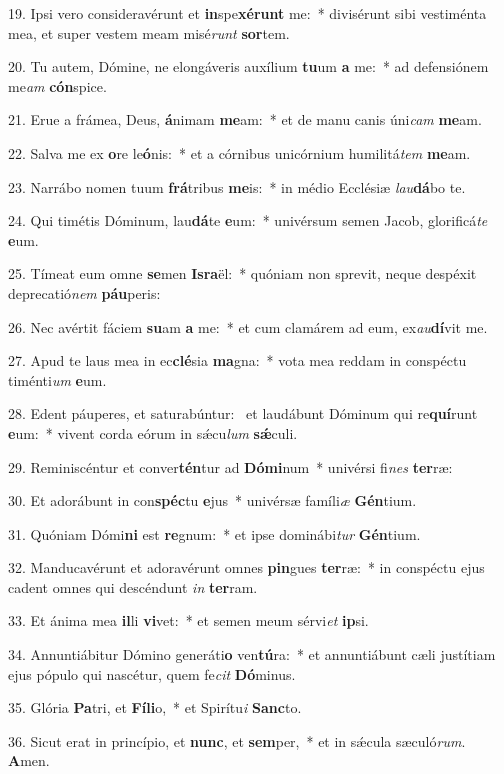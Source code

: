 19. Ipsi vero consideravérunt et \textbf{in}spe\textbf{xé}\textbf{runt} me:~*  divisérunt sibi vestiménta mea, et super vestem meam misé\textit{runt} \textbf{sor}tem.\

20. Tu autem, Dómine, ne elongáveris auxílium \textbf{tu}um \textbf{a} me:~*  ad defensiónem me\textit{am} \textbf{cón}spice.\

21. Erue a frámea, Deus, \textbf{á}nimam \textbf{me}am:~*  et de manu canis úni\textit{cam} \textbf{me}am.\

22. Salva me ex \textbf{o}re le\textbf{ó}nis:~*  et a córnibus unicórnium humilitá\textit{tem} \textbf{me}am.\

23. Narrábo nomen tuum \textbf{frá}tribus \textbf{me}is:~*  in médio Ecclésiæ \textit{lau}\textbf{dá}bo te.\

24. Qui timétis Dóminum, lau\textbf{dá}te \textbf{e}um:~*  univérsum semen Jacob, glorificá\textit{te} \textbf{e}um.\

25. Tímeat eum omne \textbf{se}men \textbf{Is}\textbf{ra}ël:~*  quóniam non sprevit, neque despéxit deprecatió\textit{nem} \textbf{páu}peris:\

26. Nec avértit fáciem \textbf{su}am \textbf{a} me:~*  et cum clamárem ad eum, ex\textit{au}\textbf{dí}vit me.\

27. Apud te laus mea in ec\textbf{clé}sia \textbf{ma}gna:~*  vota mea reddam in conspéctu timénti\textit{um} \textbf{e}um.\

28. Edent páuperes, et saturabúntur: \dag\  et laudábunt Dóminum qui re\textbf{quí}runt \textbf{e}um:~*  vivent corda eórum in sǽcu\textit{lum} \textbf{sǽ}culi.\

29. Reminiscéntur et conver\textbf{tén}tur ad \textbf{Dó}\textbf{mi}num~*  univérsi fi\textit{nes} \textbf{ter}ræ:\

30. Et adorábunt in con\textbf{spéc}tu \textbf{e}jus~*  univérsæ famíli\textit{æ} \textbf{Gén}tium.\

31. Quóniam Dómi\textbf{ni} est \textbf{re}gnum:~*  et ipse dominábi\textit{tur} \textbf{Gén}tium.\

32. Manducavérunt et adoravérunt omnes \textbf{pin}gues \textbf{ter}ræ:~*  in conspéctu ejus cadent omnes qui descéndunt \textit{in} \textbf{ter}ram.\

33. Et ánima mea \textbf{il}li \textbf{vi}vet:~*  et semen meum sérvi\textit{et} \textbf{ip}si.\

34. Annuntiábitur Dómino generáti\textbf{o} ven\textbf{tú}ra:~*  et annuntiábunt cæli justítiam ejus pópulo qui nascétur, quem fe\textit{cit} \textbf{Dó}minus.\

35. Glória \textbf{Pa}tri, et \textbf{Fí}\textbf{li}o,~*  et Spirítu\textit{i} \textbf{Sanc}to.\

36. Sicut erat in princípio, et \textbf{nunc}, et \textbf{sem}per,~*  et in sǽcula sæculó\textit{rum}. \textbf{A}men.\

